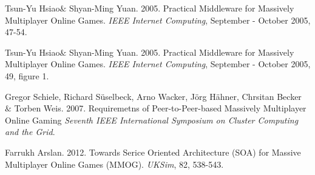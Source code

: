 \begin{thebibliography}{9}

	Tsun-Yu Hsiao$\&$ Shyan-Ming Yuan.
	2005.	
 	Practical Middleware for Massively Multiplayer Online Games.
	\emph{IEEE Internet Computing},
	September - October 2005, 47-54.

	Tsun-Yu Hsiao$\&$ Shyan-Ming Yuan.
	2005.	
 	Practical Middleware for Massively Multiplayer Online Games.
	\emph{IEEE Internet Computing},
	September - October 2005, 49, figure 1.

	Gregor Schiele, Richard S\"{u}selbeck, Arno Wacker, J\"{o}rg H\"{a}hner, Chrsitan Becker $\&$ Torben Weis.
	2007.	
 	Requiremetns of Peer-to-Peer-based Massively Multiplayer Online Gaming
	\emph{Seventh IEEE International Symposium on Cluster Computing and the Grid}.

	Farrukh Arslan.
	2012.	
 	Towards Serice Oriented Architecture (SOA) for Massive Multiplayer Online Games (MMOG).
	\emph{UKSim},
	82, 538-543.
\end{thebibliography}